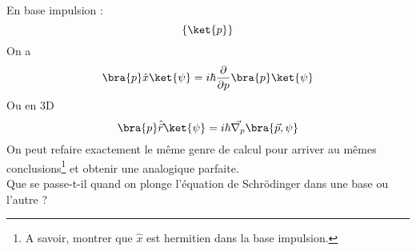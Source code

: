 En base impulsion :
\begin{equation}
\left\{\ket{p}\right\}
\end{equation}
On a 
\begin{equation}
\bra{p}\hat{x}\ket{\psi} = i\hbar \frac{\partial}{\partial p}\bra{p}\ket{\psi}
\end{equation}
Ou en 3D
\begin{equation}
\bra{p}\hat{\vec{r}}\ket{\psi} = i\hbar\vec{\nabla_p}\bra{\vec{p},\psi}
\end{equation}
On peut refaire exactement le même genre de calcul pour arriver au mêmes conclusions\footnote{A savoir, 
montrer que $\hat{x}$ est hermitien dans la base impulsion.} et obtenir une analogique parfaite.\\

Que se passe-t-il quand on plonge l'équation de Schrödinger dans une base ou l'autre ?

